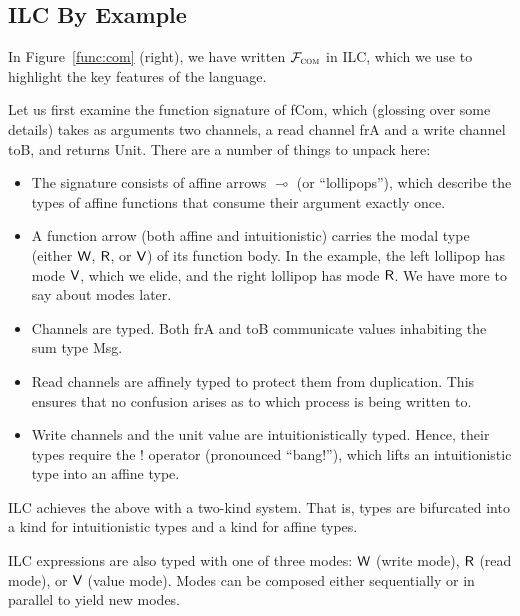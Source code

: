\subsection{ILC By Example}
\label{subsec:ilc-flavored}

In Figure~\ref{func:com} (right), we have written $\mathcal{{F}}_{\textsc{com}}$ in ILC,
which we use to highlight the key features of the language. \smallskip

 Let us first examine the function signature of
\textsf{fCom}, which (glossing over some details) takes as arguments two
channels, a read channel \textsf{frA} and a write channel \textsf{toB}, and
returns \textsf{Unit}. There are a number of things to unpack here:

\begin{itemize}[leftmargin=*]
  \item The signature consists of affine arrows $\multimap$ (or ``lollipops''), which
    describe the types of affine functions that consume their argument exactly
    once.
  \item A function arrow (both affine and intuitionistic) carries the modal type
    (either $\textsf{W}$, $\textsf{R}$, or $\textsf{V}$) of its function body. In the example, the
    left lollipop has mode $\textsf{V}$, which we elide, and the right lollipop has
    mode $\textsf{R}$. We have more to say about modes later.
  \item Channels are typed. Both \textsf{frA} and \textsf{toB} communicate
    values inhabiting the sum type \textsf{Msg}.
  \item Read channels are affinely typed to protect them from duplication. This
    ensures that no confusion arises as to which process is being written to.
  \item Write channels and the unit value are intuitionistically typed. Hence,
    their types require the ! operator (pronounced ``bang!''), which lifts an
    intuitionistic type into an affine type.
\end{itemize}

\noindent ILC achieves the above with a two-kind system. That is, types are
bifurcated into a kind for intuitionistic types and a kind for affine
types.\smallskip

 ILC expressions are also typed with one of three modes:
$\textsf{W}$ (write mode), $\textsf{R}$ (read mode), or $\textsf{V}$ (value mode). Modes can be
composed either sequentially or in parallel to yield new modes.

